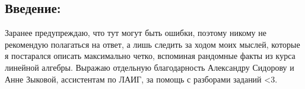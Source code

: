 \documentclass[12pt, a4paper]{article}
\begin{document}
\maketitle
\thispagestyle{empty}

\subsection*{Введение:}
Заранее предупреждаю, что тут могут быть ошибки, поэтому никому не рекомендую полагаться на ответ, а лишь следить за ходом моих мыслей, которые я постарался описать максимально четко, вспоминая рандомные факты из курса линейной алгебры. Выражаю отдельную благодарность Александру Сидорову и Анне Зыковой, ассистентам по ЛАИГ, за помощь с разборами заданий <3.


\newpage

\newpage

\newpage

\newpage

\newpage

\newpage

\newpage

\end{document}
